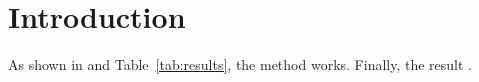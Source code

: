 \documentclass{article}
\begin{document}
\section{Introduction}
As shown in \cite{knuth1984} and Table~\ref{tab:results}, the method works.
Finally, the result .
\end{document}
